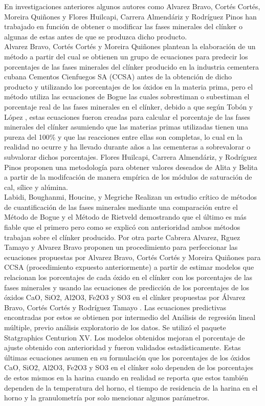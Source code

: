 \documentclass[spanish]{report}
\begin{document}
En investigaciones anteriores algunos autores como Alvarez Bravo, Cortés Cortés, Moreira Quiñones y Flores Huilcapi, Carrera Almendáriz y Rodríguez Pinos \cite{huilcapi2020analisis} han trabajado en función de obtener o modificar las fases minerales del clínker o algunas de estas antes de que se produzca dicho producto. \\

Alvarez Bravo, Cortés Cortés y Moreira Quiñones plantean la elaboración de un método a partir del cual se obtienen un grupo de ecuaciones para predecir los porcentajes de las fases minerales del clínker producido en la industria cementera cubana Cementos Cienfuegos SA (CCSA) antes de la obtención de dicho producto y utilizando los porcentajes de los óxidos en la materia prima, pero el método utiliza las ecuaciones de Bogue las cuales sobrestiman o subestiman el porcentaje real de las fases minerales en el clínker, debido a que según Tobón y López , estas ecuaciones fueron creadas para calcular el porcentaje de las fases minerales del clínker asumiendo que las materias primas utilizadas tienen una pureza del 100\% y que las reacciones entre ellas son completas, lo cual en la realidad no ocurre y ha llevado durante años a las cementeras a sobrevalorar o subvalorar dichos porcentajes.
Flores Huilcapi, Carrera Almendáriz, y Rodríguez Pinos proponen una metodología para obtener valores deseados de Alita y Belita a partir de la modifcación de manera empírica de los módulos de saturación de cal, sílice y alúmina.\\

Labidi, Boughanmi, Houcine, y Megriche \cite{labidi2019critical} Realizan un estudio crítico de métodos de cuantificación de las fases minerales  mediante una comparación entre el Método de Bogue y el Método de Rietveld demostrando que el último es más fiable que el primero pero como se explicó con anterioridad ambos métodos trabajan sobre el clínker producido. 
Por otra parte Cabrera Alvarez, Rguez Tamayo y Alvarez Bravo proponen un procedimiento para perfeccionar las ecuaciones propuestas por Alvarez Bravo, Cortés Cortés y Moreira Quiñones  para CCSA (procedimiento expuesto anteriormente) a partir de estimar modelos que relacionan los porcentajes de cada óxido en el clínker con los porcentajes de las fases minerales y usando las ecuaciones de predicción de los porcentajes de los óxidos CaO, SiO2, Al2O3, Fe2O3 y SO3 en el clínker propuestas por Álvarez Bravo, Cortés Cortés y Rodríguez Tamayo . Las ecuaciones predictivas encontradas por estos se obtienen por intermedio del Análisis de regresión lineal múltiple, previo análisis exploratorio de los datos. Se utilizó el paquete Statgraphics Centurion XV. Los modelos obtenidos mejoran el porcentaje de ajuste obtenido con anterioridad y fueron validados estadísticamente. Estas últimas ecuaciones asumen en su formulación que los porcentajes de los óxidos CaO, SiO2, Al2O3, Fe2O3 y SO3 en el clínker solo dependen de los porcentajes de estos mismos en la harina cuando en realidad se reporta que estos también dependen de la temperatura del horno, el tiempo de residencia de la harina en el horno y la granulometría por solo mencionar algunos parámetros.\\
\end{document}
